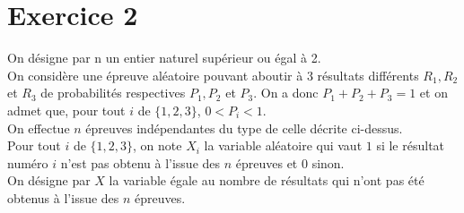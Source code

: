 \documentclass[11pt]{article}%
\begin{document}
\section*{Exercice 2}

On désigne par n un entier naturel supérieur ou égal à 2.\\
On considère une épreuve aléatoire pouvant aboutir à 3 résultats
différents $R_{1},R_{2}$ et $R_{3}$ de probabilités respectives
$P_{1},P_{2}$ et $P_{3}$. On a donc $P_{1} + P_{2} + P_{3} = 1$ et on
admet que, pour tout $i$ de $\{1,2,3\}$, $0<P_{i}<1$.\\
On effectue $n$ épreuves indépendantes du type de celle décrite
ci-dessus.\\
Pour tout $i$ de $\{1,2,3\}$, on note $X_{i}$ la variable aléatoire qui
vaut 
$1$ si le résultat numéro $i$ n'est pas obtenu à l'issue des $n$
épreuves et 
$0$ sinon.\\
On désigne par $X$ la variable égale au nombre de résultats qui n'ont
pas été
obtenus à l'issue des $n$ épreuves.
\end{document}

